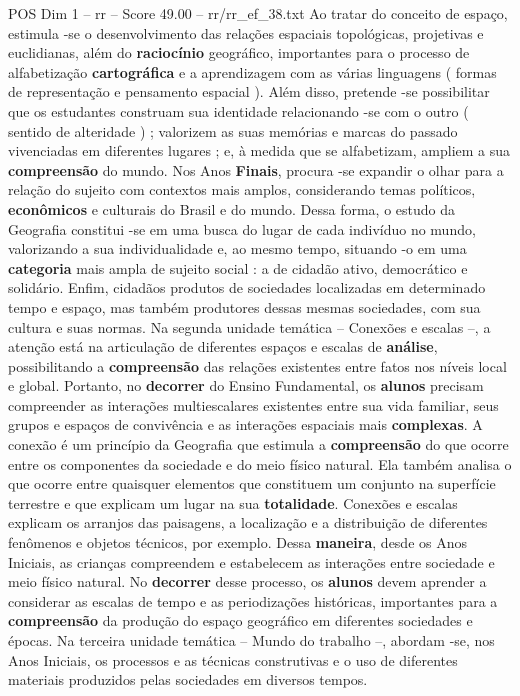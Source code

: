 \begin{textsample}{POS Dim 1 – rr – Score 49.00 – rr/rr\_ef\_38.txt}
Ao tratar do conceito de espaço, estimula -se o desenvolvimento das relações espaciais topológicas, projetivas e euclidianas, além do \textbf{raciocínio} geográfico, importantes para o processo de alfabetização \textbf{cartográfica} e a aprendizagem com as várias linguagens ( formas de representação e pensamento espacial ).
Além disso, pretende -se possibilitar que os estudantes construam sua identidade relacionando -se com o outro ( sentido de alteridade ) ; valorizem as suas memórias e marcas do passado vivenciadas em diferentes lugares ; e, à medida que se alfabetizam, ampliem a sua \textbf{compreensão} do mundo.
Nos Anos \textbf{Finais}, procura -se expandir o olhar para a relação do sujeito com contextos mais amplos, considerando temas políticos, \textbf{econômicos} e culturais do Brasil e do mundo.
Dessa forma, o estudo da Geografia constitui -se em uma busca do lugar de cada indivíduo no mundo, valorizando a sua individualidade e, ao mesmo tempo, situando -o em uma \textbf{categoria} mais ampla de sujeito social : a de cidadão ativo, democrático e solidário.
Enfim, cidadãos produtos de sociedades localizadas em determinado tempo e espaço, mas também produtores dessas mesmas sociedades, com sua cultura e suas normas.
Na segunda unidade temática – Conexões e escalas –, a atenção está na articulação de diferentes espaços e escalas de \textbf{análise}, possibilitando a \textbf{compreensão} das relações existentes entre fatos nos níveis local e global.
Portanto, no \textbf{decorrer} do Ensino Fundamental, os \textbf{alunos} precisam compreender as interações multiescalares existentes entre sua vida familiar, seus grupos e espaços de convivência e as interações espaciais mais \textbf{complexas}.
A conexão é um princípio da Geografia que estimula a \textbf{compreensão} do que ocorre entre os componentes da sociedade e do meio físico natural.
Ela também analisa o que ocorre entre quaisquer elementos que constituem um conjunto na superfície terrestre e que explicam um lugar na sua \textbf{totalidade}.
Conexões e escalas explicam os arranjos das paisagens, a localização e a distribuição de diferentes fenômenos e objetos técnicos, por exemplo.
Dessa \textbf{maneira}, desde os Anos Iniciais, as crianças compreendem e estabelecem as interações entre sociedade e meio físico natural.
No \textbf{decorrer} desse processo, os \textbf{alunos} devem aprender a considerar as escalas de tempo e as periodizações históricas, importantes para a \textbf{compreensão} da produção do espaço geográfico em diferentes sociedades e épocas.
Na terceira unidade temática – Mundo do trabalho –, abordam -se, nos Anos Iniciais, os processos e as técnicas construtivas e o uso de diferentes materiais produzidos pelas sociedades em diversos tempos.

\end{textsample}
